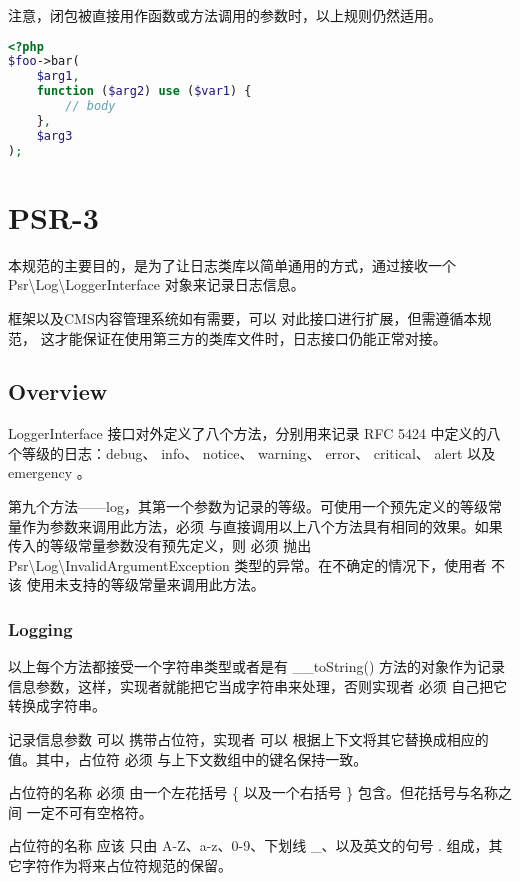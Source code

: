 注意，闭包被直接用作函数或方法调用的参数时，以上规则仍然适用。

\begin{lstlisting}[language=PHP]
<?php
$foo->bar(
    $arg1,
    function ($arg2) use ($var1) {
        // body
    },
    $arg3
);
\end{lstlisting}

\chapter{PSR-3}

本规范的主要目的，是为了让日志类库以简单通用的方式，通过接收一个 Psr\textbackslash Log\textbackslash LoggerInterface 对象来记录日志信息。 

框架以及CMS内容管理系统如有需要，可以 对此接口进行扩展，但需遵循本规范， 这才能保证在使用第三方的类库文件时，日志接口仍能正常对接。


\section{Overview}

LoggerInterface 接口对外定义了八个方法，分别用来记录 RFC 5424 中定义的八个等级的日志：debug、 info、 notice、 warning、 error、 critical、 alert 以及 emergency 。

第九个方法——log，其第一个参数为记录的等级。可使用一个预先定义的等级常量作为参数来调用此方法，必须 与直接调用以上八个方法具有相同的效果。如果传入的等级常量参数没有预先定义，则 必须 抛出 Psr\textbackslash Log\textbackslash InvalidArgumentException 类型的异常。在不确定的情况下，使用者 不该 使用未支持的等级常量来调用此方法。

\subsection{Logging}


以上每个方法都接受一个字符串类型或者是有 \_\_toString() 方法的对象作为记录信息参数，这样，实现者就能把它当成字符串来处理，否则实现者 必须 自己把它转换成字符串。

记录信息参数 可以 携带占位符，实现者 可以 根据上下文将其它替换成相应的值。其中，占位符 必须 与上下文数组中的键名保持一致。

占位符的名称 必须 由一个左花括号 \{ 以及一个右括号 \} 包含。但花括号与名称之间 一定不可有空格符。

占位符的名称 应该 只由 A-Z、a-z、0-9、下划线 \_、以及英文的句号 . 组成，其它字符作为将来占位符规范的保留。


